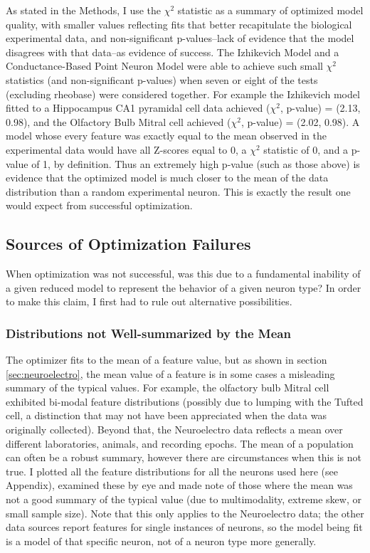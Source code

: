 As stated in the Methods, I use the $\chi^2$ statistic as a summary of optimized model quality, with smaller values reflecting fits that better recapitulate the biological experimental data, and non-significant p-values--lack of evidence that the model disagrees with that data--as evidence of success.
The Izhikevich Model and a Conductance-Based Point Neuron Model were able to achieve such small $\chi^2$ statistics (and non-significant p-values) when seven or eight of the tests (excluding rheobase) were considered together.
For example the Izhikevich model fitted to a Hippocampus CA1 pyramidal cell data achieved ($\chi^2$, p-value) = (2.13, 0.98), and the Olfactory Bulb Mitral cell achieved ($\chi^2$, p-value) = (2.02, 0.98).
A model whose every feature was exactly equal to the mean observed in the experimental data would have all Z-scores equal to 0, a $\chi^2$ statistic of 0, and a p-value of 1, by definition.
Thus an extremely high p-value (such as those above) is evidence that the optimized model is much closer to the mean of the data distribution than a random experimental neuron.
This is exactly the result one would expect from successful optimization.

\subsection{Sources of Optimization Failures}
When optimization was not successful, was this due to a fundamental inability of a given reduced model to represent the behavior of a given neuron type?
In order to make this claim, I first had to rule out alternative possibilities.

\subsubsection{Distributions not Well-summarized by the Mean}
The optimizer fits to the mean of a feature value, but as shown in section \ref{sec:neuroelectro}, the mean value of a feature is in some cases a misleading summary of the typical values.
For example, the olfactory bulb Mitral cell exhibited bi-modal feature distributions (possibly due to lumping with the Tufted cell, a distinction that may not have been appreciated when the data was originally collected).
Beyond that, the Neuroelectro data reflects a mean over different laboratories, animals, and recording epochs. The mean of a population can often be a robust summary, however there are circumstances when this is not true.
I plotted all the feature distributions for all the neurons used here (see Appendix), examined these by eye and made note of those where the mean was not a good summary of the typical value (due to multimodality, extreme skew, or small sample size).
Note that this only applies to the Neuroelectro data; the other data sources report features for single instances of neurons, so the model being fit is a model of that specific neuron, not of a neuron type more generally.

